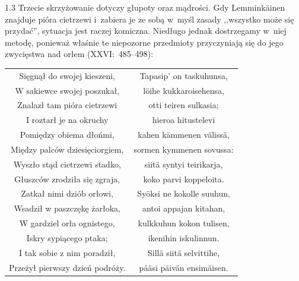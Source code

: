 \documentclass[11pt,a4paper,twoside]{report}
\begin{document}
\newpage
\begin{spacing}{1.3}
Trzecie skrzyżowanie dotyczy głupoty oraz mądrości. Gdy Lemminkäinen znajduje pióra cietrzewi i~zabiera je ze sobą w~myśl zasady ,,wszystko może się przydać'', sytuacja jest raczej komiczna. Niedługo jednak dostrzegamy w~niej metodę, ponieważ właśnie te niepozorne przedmioty przyczyniają się do jego zwycięstwa nad orłem (XXVI:~485--498):
\end{spacing}
{\centering
\small
\begin{longtable}{c c}
Sięgnął do swojej kieszeni, & Tapasip' on taskuhunsa, \\
W sakiewce swojej poszukał, & löihe kukkaroisehensa, \\
Znalazł tam pióra cietrzewi & otti teiren sulkasia; \\
I roztarł je na okruchy & hieroa hitustelevi \\
Pomiędzy obiema dłońmi, & kahen kämmenen välissä, \\
Między palców dziesięciorgiem, & sormen kymmenen sovussa: \\
Wyszło stąd cietrzewi stadko, & siitä syntyi teirikarja, \\
Głuszców zrodziła się zgraja, & koko parvi koppeloita. \\
Zatkał nimi dziób orłowi, & Syöksi ne kokolle suuhun, \\
Wsadził w paszczękę żarłoka, & antoi appajan kitahan, \\
W gardziel orła ognistego, & kulkkuhun kokon tulisen, \\
Iskry sypiącego ptaka; & ikenihin iskulinnun. \\
I tak sobie z nim poradził, & Sillä siitä selvittihe, \\
Przeżył pierwszy dzień podróży. & pääsi päivän ensimäisen. \\
\end{longtable}
}
\vspace*{0.5\baselineskip}
\end{document}
